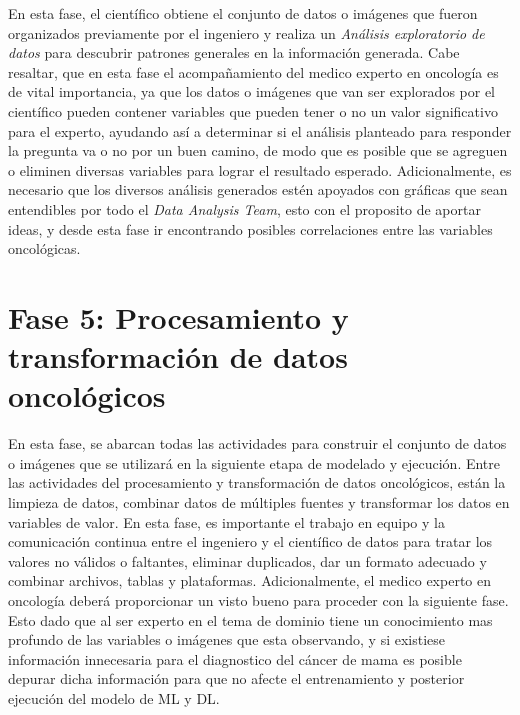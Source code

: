 En esta fase, el científico obtiene el conjunto de datos o imágenes que fueron organizados previamente por el ingeniero y realiza un \textit{Análisis exploratorio de datos} para descubrir patrones generales en la información generada. Cabe resaltar, que en esta fase el acompañamiento del medico experto en oncología es de vital importancia, ya que los datos o imágenes que van ser explorados por el científico pueden contener variables que pueden tener o no un valor significativo para el experto, ayudando así a determinar si el análisis planteado para responder la pregunta va o no por un buen camino, de modo que es posible que se agreguen o eliminen diversas variables para lograr el resultado esperado. Adicionalmente, es necesario que los diversos análisis generados estén apoyados con gráficas que sean entendibles por todo el \textit{Data Analysis Team}, esto con el proposito de aportar ideas, y desde esta fase ir encontrando posibles correlaciones entre las variables oncológicas.

\section{Fase 5: Procesamiento y transformación de datos oncológicos}
En esta fase, se abarcan todas las actividades para construir el conjunto de datos o imágenes que se utilizará en la siguiente etapa de modelado y ejecución. Entre las actividades del procesamiento y transformación de datos oncológicos, están la limpieza de datos, combinar datos de múltiples fuentes y transformar los datos en variables de valor. En esta fase, es importante el trabajo en equipo y la comunicación continua entre el ingeniero y el científico de datos para tratar los valores no válidos o faltantes, eliminar duplicados, dar un formato adecuado y combinar archivos, tablas y plataformas. Adicionalmente, el medico experto en oncología deberá proporcionar un visto bueno para proceder con la siguiente fase. Esto dado que al ser experto en el tema de dominio tiene un conocimiento mas profundo de las variables o imágenes que esta observando, y si existiese información innecesaria para el diagnostico del cáncer de mama es posible depurar dicha información para que no afecte el entrenamiento y posterior ejecución del modelo de ML y DL.

